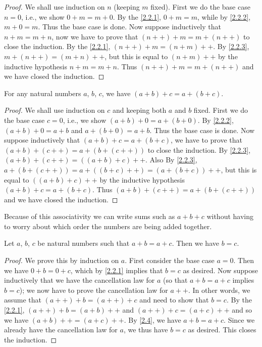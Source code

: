 \begin{proof}
  We shall use induction on \(n\) (keeping \(m\) fixed).
  First we do the base case \(n = 0\), i.e., we show \(0 + m = m + 0\).
  By the \cref{2.2.1}, \(0 + m = m\), while by \cref{2.2.2}, \(m + 0 = m\).
  Thus the base case is done.
  Now suppose inductively that \(n + m = m + n\), now we have to prove that \((n++) + m = m + (n++)\) to close the induction.
  By the \cref{2.2.1}, \((n++) + m = (n + m)++\).
  By \cref{2.2.3}, \(m + (n++) = (m + n)++\), but this is equal to \((n + m)++\) by the inductive hypothesis \(n+m=m+n\).
  Thus \((n++) + m = m + (n++)\) and we have closed the induction.
\end{proof}

\begin{prop}\label{2.2.5}
  For any natural numbers \(a\), \(b\), \(c\), we have \((a + b) + c = a + (b + c)\).
\end{prop}

\begin{proof}
  We shall use induction on \(c\) and keeping both \(a\) and \(b\) fixed.
  First we do the base case \(c = 0\), i.e., we show \((a + b) + 0 = a + (b + 0)\).
  By \cref{2.2.2}, \((a + b) + 0 = a + b\) and \(a + (b + 0) = a + b\).
  Thus the base case is done.
  Now suppose inductively that \((a + b) + c = a + (b + c)\), we have to prove that \((a + b) + (c++) = a + (b + (c++))\) to close the induction.
  By \cref{2.2.3}, \((a + b) + (c++) = ((a + b) + c)++\).
  Also By \cref{2.2.3}, \(a + (b + (c++)) = a + ((b + c)++) = (a + (b + c))++\), but this is equal to \(((a + b) + c)++\) by the inductive hypothesis \((a + b) + c = a + (b + c)\).
  Thus \((a + b) + (c++) = a + (b + (c++))\) and we have closed the induction.
\end{proof}

\begin{note}
  Because of this associativity we can write sums such as \(a + b + c\) without having to worry about which order the numbers are being added together.
\end{note}

\begin{prop}\label{2.2.6}
  Let \(a\), \(b\), \(c\) be natural numbers such that \(a + b = a + c\).
  Then we have \(b = c\).
\end{prop}

\begin{proof}
  We prove this by induction on \(a\).
  First consider the base case \(a = 0\).
  Then we have \(0 + b = 0 + c\), which by \cref{2.2.1} implies that \(b = c\) as desired.
  Now suppose inductively that we have the cancellation law for \(a\) (so that \(a + b = a + c\) implies \(b = c\));
  we now have to prove the cancellation law for \(a++\).
  In other words, we assume that \((a++) + b = (a++) + c\) and need to show that \(b = c\).
  By the \cref{2.2.1}, \((a++) + b = (a + b)++\) and \((a++) + c = (a + c)++\) and so we have \((a + b)++ = (a + c)++\).
  By \cref{2.4}, we have \(a + b = a + c\).
  Since we already have the cancellation law for \(a\), we thus have \(b = c\) as desired.
  This closes the induction.
\end{proof}

